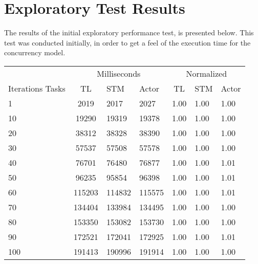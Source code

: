 \chapter[]{Exploratory Test Results}
\label{app:explo_result}
The results of the initial exploratory performance test, is presented below. This test was conducted initially, in order to get a feel of the execution time for the concurrency model.

\begin{table}[h]
\centering
\begin{tabular}{l|cll|cll}
             & \multicolumn{3}{c|}{Milliseconds} & \multicolumn{3}{c}{Normalized} \\
Iterations Tasks & TL     & STM     & Actor     & TL      & STM      & Actor     \\ \hline
1  	&		2019		&      2017		&		2027    &  1.00   & 1.00 &    1.00    \\
10	&		19290		&      19319		&		19378   &  1.00   & 1.00 &    1.00    \\
20	&		38312		&      38328		&		38390   &  1.00   & 1.00 &    1.00    \\
30	&		57537		&      57508		&		57578   &  1.00   & 1.00 &    1.00    \\
40	&		76701		&      76480		&		76877   &  1.00   & 1.00 &    1.01    \\
50	&		96235		&      95854 	&		96398   &  1.00   & 1.00 &    1.01    \\
60  	&		115203	&      114832	&		115575  &  1.00   & 1.00 &    1.01    \\
70	&		134404	&      133984	&		134495  &  1.00   & 1.00 &    1.00    \\
80	&		153350	&      153082	&		153730  &  1.00   & 1.00 &    1.00    \\
90	&		172521	&      172041	&		172925  &  1.00   & 1.00 &    1.01    \\
100	&		191413	&      190996	&		191914  &  1.00   & 1.00 &    1.00    \\
\end{tabular}
\label{table:test_results_concurrent_tasks}
\end{table}
\label{table:test_results_iterations}

